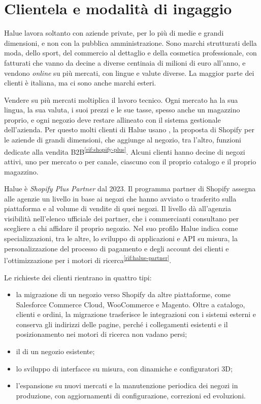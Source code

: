 
\section{Clientela e modalità di ingaggio}
\label{sec:clientela}

Halue lavora soltanto con aziende private, per lo più di medie e grandi dimensioni, e non con la
pubblica amministrazione. Sono marchi strutturati della moda, dello sport, del commercio al
dettaglio e della cosmetica professionale, con fatturati che vanno da decine a diverse centinaia di
milioni di euro all’anno, e vendono \emph{online} su più mercati, con lingue e valute diverse. La
maggior parte dei clienti è italiana, ma ci sono anche marchi esteri.

Vendere su più mercati moltiplica il lavoro tecnico. Ogni mercato ha la sua lingua, la sua valuta,
i suoi prezzi e le sue tasse, spesso anche un magazzino proprio, e ogni negozio deve restare
allineato con il sistema gestionale dell’azienda. Per questo molti clienti di Halue usano
, la proposta di Shopify per le aziende di grandi dimensioni, che
aggiunge al negozio, tra l’altro, funzioni dedicate alla vendita
B2B\textsuperscript{\ref{rif:shopify-plus}}. Alcuni clienti hanno decine di negozi attivi, uno per
mercato o per canale, ciascuno con il proprio catalogo e il proprio magazzino.

Halue è \emph{Shopify Plus Partner} dal 2023. Il programma partner di Shopify assegna alle agenzie
un livello in base ai negozi che hanno avviato o trasferito sulla piattaforma e al volume di vendite
di quei negozi. Il livello dà all’agenzia visibilità nell’elenco ufficiale dei partner, che i
commercianti consultano per scegliere a chi affidare il proprio negozio. Nel suo profilo Halue
indica come specializzazioni, tra le altre, lo sviluppo di applicazioni e API su misura, la
personalizzazione del processo di pagamento e degli account dei clienti e l’ottimizzazione per i
motori di ricerca\textsuperscript{\ref{rif:halue-partner}}.

Le richieste dei clienti rientrano in quattro tipi:

\begin{itemize}
	\item la migrazione di un negozio verso Shopify da altre piattaforme, come Salesforce Commerce
	Cloud, WooCommerce e Magento. Oltre a catalogo, clienti e ordini, la migrazione trasferisce le
	integrazioni con i sistemi esterni e conserva gli indirizzi delle pagine, perché i collegamenti
	esistenti e il posizionamento nei motori di ricerca non vadano persi;
	\item il  di un negozio esistente;
	\item lo sviluppo di interfacce su misura, con 
	dinamiche e configuratori 3D;
	\item l’espansione su nuovi mercati e la manutenzione periodica dei negozi in produzione, con
	aggiornamenti di configurazione, correzioni ed evoluzioni.
\end{itemize}

